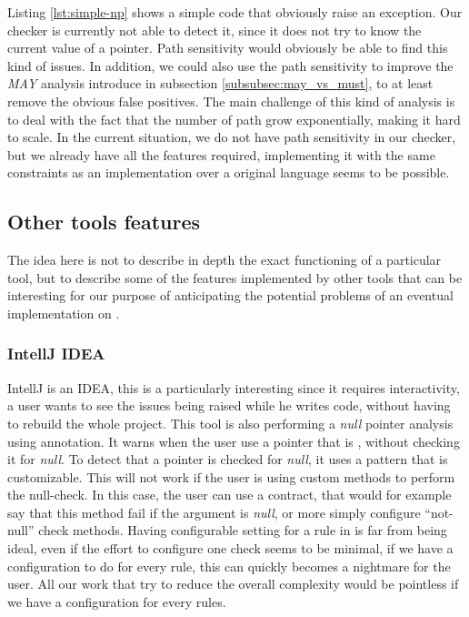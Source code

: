 

Listing \ref{lst:simple-np} shows a simple code that obviously raise an exception. Our checker is currently not able to detect it, since it does not try to know the current value of a pointer.
Path sensitivity would obviously be able to find this kind of issues.
In addition, we could also use the path sensitivity to improve the \emph{MAY} analysis introduce in subsection \ref{subsubsec:may_vs_must}, to at least remove the obvious false positives. 
The main challenge of this kind of analysis is to deal with the fact that the number of path grow exponentially, making it hard to scale. 
In the current situation, we do not have path sensitivity in our checker, but we already have all the features required, implementing it with the same constraints as an implementation over a original language seems to be possible.

\subsection{Other tools features}
\label{subsec:other_tools_features}

The idea here is not to describe in depth the exact functioning of a particular tool, but to describe some of the features implemented by other tools that can be interesting for our purpose of anticipating the potential problems of an eventual implementation on \slang{}.

\subsubsection{IntellJ IDEA}
\label{subsubsec:intellj_idea}

IntellJ is an IDEA, this is a particularly interesting since it requires interactivity, a user wants to see the issues being raised while he writes code, without having to rebuild the whole project. 
This tool is also performing a \emph{null} pointer analysis using annotation. 
It warns when the user use a pointer that is \nullable{}, without checking it for \emph{null}. 
To detect that a pointer is checked for \emph{null}, it uses a pattern that is customizable. 
This will not work if the user is using custom methods to perform the null-check. 
In this case, the user can use a contract, that would for example say that this method fail if the argument is \emph{null}, or more simply configure “not-null” check methods.\newline
Having configurable setting for a rule in \slang{} is far from being ideal, even if the effort to configure one check seems to be minimal, if we have a configuration to do for every rule, this can quickly becomes a nightmare for the user. 
All our work that try to reduce the overall complexity would be pointless if we have a configuration for every rules.


